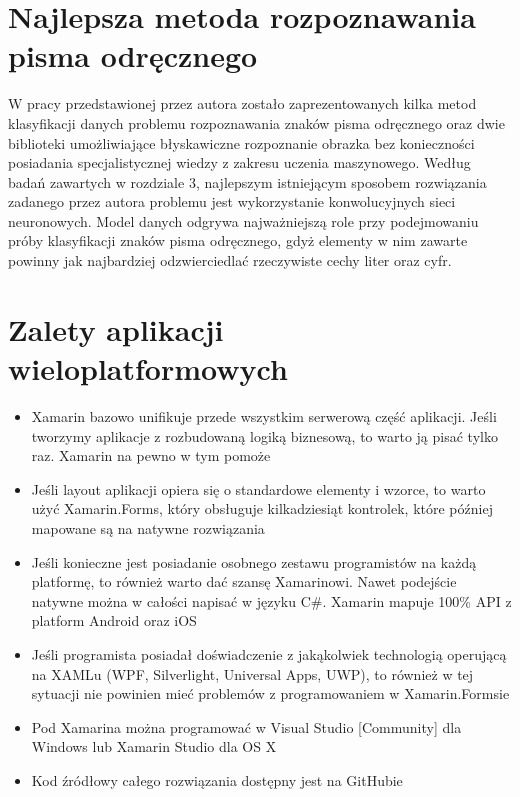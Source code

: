 \documentclass[brudnopis]{xmgr}
\begin{document}
\section{Najlepsza metoda rozpoznawania pisma odręcznego}

W pracy przedstawionej przez autora zostało zaprezentowanych kilka metod klasyfikacji
danych problemu rozpoznawania znaków pisma odręcznego oraz dwie
biblioteki umożliwiające błyskawiczne rozpoznanie obrazka bez konieczności posiadania
specjalistycznej wiedzy z zakresu uczenia maszynowego.
Według badań zawartych w rozdziale 3, najlepszym istniejącym sposobem rozwiązania
zadanego przez autora problemu jest wykorzystanie konwolucyjnych sieci
neuronowych. Model danych odgrywa najważniejszą role przy podejmowaniu
próby klasyfikacji znaków pisma odręcznego, gdyż elementy w nim zawarte powinny
jak najbardziej odzwierciedlać rzeczywiste cechy liter oraz cyfr.

\section{Zalety aplikacji wieloplatformowych}

\begin{itemize}
\item
Xamarin bazowo unifikuje przede wszystkim serwerową część aplikacji. Jeśli tworzymy aplikacje z rozbudowaną logiką biznesową, to warto ją pisać tylko raz. Xamarin na pewno w tym pomoże
\item
Jeśli layout aplikacji opiera się o standardowe elementy i wzorce, to warto użyć Xamarin.Forms, który obsługuje kilkadziesiąt kontrolek, które później mapowane są na natywne rozwiązania
\item
Jeśli konieczne jest posiadanie osobnego zestawu programistów na każdą platformę, to również warto dać szansę Xamarinowi. Nawet podejście natywne można w całości napisać w języku C\#. Xamarin mapuje 100\% API z platform Android oraz iOS
\item
Jeśli programista posiadał doświadczenie z jakąkolwiek technologią operującą na XAMLu (WPF, Silverlight, Universal Apps, UWP), to również w tej sytuacji nie powinien mieć problemów z programowaniem w Xamarin.Formsie
\item
Pod Xamarina można programować w Visual Studio [Community] dla Windows lub Xamarin Studio dla OS X
\item
Kod źródłowy całego rozwiązania dostępny jest na GitHubie
\end{itemize}
\end{document}
